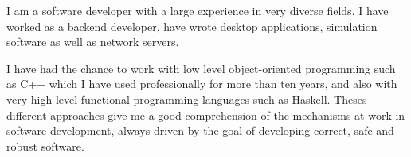 
\begin{cvparagraph}

    I am a software developer with a large experience in very diverse fields.
    I have worked as a backend developer, have wrote desktop applications,
    simulation software as well as network servers.

    I have had the chance to work with low level object-oriented programming
    such as C++ which I have used professionally for more than ten years, and
    also with very high level functional programming languages such as Haskell.
    Theses different approaches give me a good comprehension of the mechanisms
    at work in software development, always driven by the goal of developing
    correct, safe and robust software.

\end{cvparagraph}

